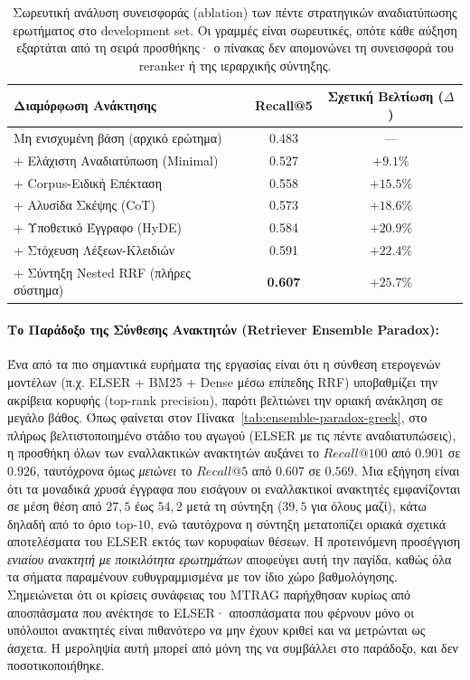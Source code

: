 \begin{table}[ht]
\centering
\small
\begin{tabular}{lcc}
\toprule
\textbf{Διαμόρφωση Ανάκτησης} & \textbf{Recall@5} & \textbf{Σχετική Βελτίωση ($\Delta$)} \\
\midrule
Μη ενισχυμένη βάση (αρχικό ερώτημα) & 0.483 & — \\
+ Ελάχιστη Αναδιατύπωση (Minimal) & 0.527 & $+9.1\%$ \\
+ Corpus-Ειδική Επέκταση & 0.558 & $+15.5\%$ \\
+ Αλυσίδα Σκέψης (CoT) & 0.573 & $+18.6\%$ \\
+ Υποθετικό Έγγραφο (HyDE) & 0.584 & $+20.9\%$ \\
+ Στόχευση Λέξεων-Κλειδιών & 0.591 & $+22.4\%$ \\
+ Σύντηξη Nested RRF (πλήρες σύστημα) & \textbf{0.607} & \textbf{$+25.7\%$} \\
\bottomrule
\end{tabular}
\caption{Σωρευτική ανάλυση συνεισφοράς (ablation) των πέντε στρατηγικών αναδιατύπωσης ερωτήματος στο development set. Οι γραμμές είναι σωρευτικές, οπότε κάθε αύξηση εξαρτάται από τη σειρά προσθήκης· ο πίνακας δεν απομονώνει τη συνεισφορά του reranker ή της ιεραρχικής σύντηξης.}
\label{tab:rewrite-ablation-greek}
\end{table}

\paragraph{Το Παράδοξο της Σύνθεσης Ανακτητών (Retriever Ensemble Paradox):}
Ένα από τα πιο σημαντικά ευρήματα της εργασίας είναι ότι η σύνθεση ετερογενών μοντέλων (π.χ. ELSER + BM25 + Dense μέσω επίπεδης RRF) υποβαθμίζει την ακρίβεια κορυφής (top-rank precision), παρότι βελτιώνει την οριακή ανάκληση σε μεγάλο βάθος. Όπως φαίνεται στον Πίνακα~\ref{tab:ensemble-paradox-greek}, στο πλήρως βελτιστοποιημένο στάδιο του αγωγού (ELSER με τις πέντε αναδιατυπώσεις), η προσθήκη όλων των εναλλακτικών ανακτητών αυξάνει το $Recall@100$ από $0.901$ σε $0.926$, ταυτόχρονα όμως \textit{μειώνει} το $Recall@5$ από $0.607$ σε $0.569$. Μια εξήγηση είναι ότι τα μοναδικά χρυσά έγγραφα που εισάγουν οι εναλλακτικοί ανακτητές εμφανίζονται σε μέση θέση από $27{,}5$ έως $54{,}2$ μετά τη σύντηξη ($39{,}5$ για όλους μαζί), κάτω δηλαδή από το όριο top-$10$, ενώ ταυτόχρονα η σύντηξη μετατοπίζει οριακά σχετικά αποτελέσματα του ELSER εκτός των κορυφαίων θέσεων. Η προτεινόμενη προσέγγιση \textit{ενιαίου ανακτητή με ποικιλότητα ερωτημάτων} αποφεύγει αυτή την παγίδα, καθώς όλα τα σήματα παραμένουν ευθυγραμμισμένα με τον ίδιο χώρο βαθμολόγησης. Σημειώνεται ότι οι κρίσεις συνάφειας του MTRAG παρήχθησαν κυρίως από αποσπάσματα που ανέκτησε το ELSER· αποσπάσματα που φέρνουν μόνο οι υπόλοιποι ανακτητές είναι πιθανότερο να μην έχουν κριθεί και να μετρώνται ως άσχετα. Η μεροληψία αυτή μπορεί από μόνη της να συμβάλλει στο παράδοξο, και δεν ποσοτικοποιήθηκε.

